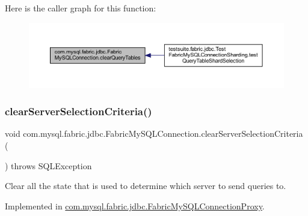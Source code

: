 Here is the caller graph for this function\+:\nopagebreak
\begin{figure}[H]
\begin{center}
\leavevmode
\includegraphics[width=350pt]{interfacecom_1_1mysql_1_1fabric_1_1jdbc_1_1_fabric_my_s_q_l_connection_a50d57924d9cec195770ff2621425e36e_icgraph}
\end{center}
\end{figure}
\mbox{\label{interfacecom_1_1mysql_1_1fabric_1_1jdbc_1_1_fabric_my_s_q_l_connection_a7e0998ece683fdc723cf3c84c16e53be}} 
\subsubsection{\texorpdfstring{clear\+Server\+Selection\+Criteria()}{clearServerSelectionCriteria()}}
{\footnotesize\ttfamily void com.\+mysql.\+fabric.\+jdbc.\+Fabric\+My\+S\+Q\+L\+Connection.\+clear\+Server\+Selection\+Criteria (\begin{DoxyParamCaption}{ }\end{DoxyParamCaption}) throws S\+Q\+L\+Exception}

Clear all the state that is used to determine which server to send queries to. 

Implemented in \mbox{\hyperlink{classcom_1_1mysql_1_1fabric_1_1jdbc_1_1_fabric_my_s_q_l_connection_proxy_a386a5ba420d486c6a8778b9d611c265b}{com.\+mysql.\+fabric.\+jdbc.\+Fabric\+My\+S\+Q\+L\+Connection\+Proxy}}.

